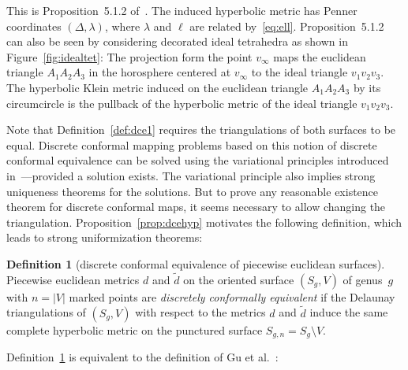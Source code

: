 \documentclass[a4paper, 11pt]{article}
\newcommand{\etal}{{et al.}}
\newcommand{\dtil}{\tilde{d}}
\theoremstyle{plain}
\theoremstyle{definition}
\newtheorem{definition}[theorem]{Definition}
\begin{document}
This is Proposition~5.1.2 of~\cite{bobenko15}. The induced hyperbolic
metric has Penner coordinates $(\Delta,\lambda)$, where $\lambda$ and
$\ell$ are related by~\eqref{eq:ell}. Proposition~5.1.2 can also be
seen by considering decorated ideal tetrahedra as shown in
Figure~\ref{fig:idealtet}: The projection form the point $v_{\infty}$
maps the euclidean triangle $A_{1}A_{2}A_{3}$ in the horosphere
centered at $v_{\infty}$ to the ideal triangle $v_{1}v_{2}v_{3}$. The
hyperbolic Klein metric induced on the euclidean triangle
$A_{1}A_{2}A_{3}$ by its circumcircle is the pullback of the
hyperbolic metric of the ideal triangle $v_{1}v_{2}v_{3}$.

Note that Definition~\ref{def:dce1} requires the triangulations of
both surfaces to be equal. Discrete conformal mapping problems based
on this notion of discrete conformal equivalence can be solved using
the variational principles introduced in~\cite{bobenko15}---provided a
solution exists. The variational principle also implies strong
uniqueness theorems for the solutions. But to prove any reasonable
existence theorem for discrete conformal maps, it seems necessary to
allow changing the triangulation.  Proposition~\ref{prop:dcehyp}
motivates the following definition, which leads to strong
uniformization theorems:

\begin{definition}[discrete conformal equivalence of piecewise
  euclidean surfaces]
  \label{def:dce2}
  Piecewise euclidean metrics $d$ and $\dtil$ on the oriented surface
  $(S_{g},V)$ of genus~$g$ with $n=|V|$ marked points are
  \emph{discretely conformally equivalent} if the Delaunay
  triangulations of $(S_{g},V)$ with respect to the metrics $d$ and
  $\dtil$ induce the same complete hyperbolic metric on the punctured
  surface $S_{g,n}=S_{g}\setminus V$.
\end{definition}

Definition~\ref{def:dce2} is equivalent to the definition of Gu
\etal~\cite{luo13}:
\end{document}

